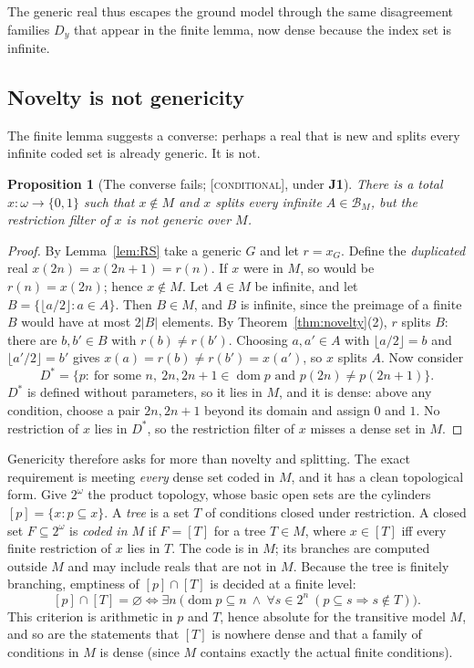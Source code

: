 \documentclass[11pt]{article}
\newcommand{\dom}{\operatorname{dom}}
\newcommand{\gradetag}[1]{\textnormal{\textsc{[#1]}}}
\newcommand{\condg}{\gradetag{conditional}}
\newtheorem{proposition}[theorem]{Proposition}
\theoremstyle{definition}
\begin{document}
The generic real thus escapes the ground model through the same disagreement families $D_y$ that
appear in the finite lemma, now dense because the index set is infinite.

\subsection{Novelty is not genericity}\label{ssec:converse}

The finite lemma suggests a converse: perhaps a real that is new and splits every infinite coded
set is already generic. It is not.

\begin{proposition}[The converse fails; \condg, under \textbf{J1}]\label{prop:converse}
There is a total $x\colon\omega\to\{0,1\}$ such that $x\notin M$ and $x$ splits every infinite
$A\in\mathcal B_M$, but the restriction filter of $x$ is not generic over $M$.
\end{proposition}

\begin{proof}
By Lemma~\ref{lem:RS} take a generic $G$ and let $r=x_G$. Define the \emph{duplicated} real
$x(2n)=x(2n+1)=r(n)$. If $x$ were in $M$, so would be $r(n)=x(2n)$; hence $x\notin M$. Let $A\in M$
be infinite, and let $B=\{\lfloor a/2\rfloor:a\in A\}$. Then $B\in M$, and $B$ is infinite, since the
preimage of a finite $B$ would have at most $2|B|$ elements. By Theorem~\ref{thm:novelty}(2), $r$
splits $B$: there are $b,b'\in B$ with $r(b)\ne r(b')$. Choosing $a,a'\in A$ with $\lfloor
a/2\rfloor=b$ and $\lfloor a'/2\rfloor=b'$ gives $x(a)=r(b)\ne r(b')=x(a')$, so $x$ splits $A$.
Now consider
\[
  D^\ast=\{p:\ \text{for some }n,\ 2n,2n+1\in\dom p\text{ and }p(2n)\ne p(2n+1)\}.
\]
$D^\ast$ is defined without parameters, so it lies in $M$, and it is dense: above any condition,
choose a pair $2n,2n+1$ beyond its domain and assign $0$ and $1$. No restriction of $x$ lies in
$D^\ast$, so the restriction filter of $x$ misses a dense set in $M$.
\end{proof}

Genericity therefore asks for more than novelty and splitting. The exact requirement is meeting
\emph{every} dense set coded in $M$, and it has a clean topological form. Give $2^\omega$ the
product topology, whose basic open sets are the cylinders $[p]=\{x: p\subseteq x\}$. A \emph{tree} is a
set $T$ of conditions closed under restriction. A closed set $F\subseteq2^\omega$ is \emph{coded in
$M$} if $F=[T]$ for a tree $T\in M$, where $x\in[T]$ iff every finite restriction of $x$ lies in
$T$. The code is in $M$; its branches are computed outside $M$ and may include reals that are not
in $M$. Because the tree is finitely branching, emptiness of $[p]\cap[T]$ is decided at a finite
level:
\[
  [p]\cap[T]=\varnothing\iff\exists n\ \bigl(\dom p\subseteq n\ \wedge\ \forall s\in2^n\
  (p\subseteq s\Rightarrow s\notin T)\bigr).
\]
This criterion is arithmetic in $p$ and $T$, hence absolute for the transitive model $M$, and so
are the statements that $[T]$ is nowhere dense and that a family of conditions in $M$ is dense
(since $M$ contains exactly the actual finite conditions).
\end{document}
